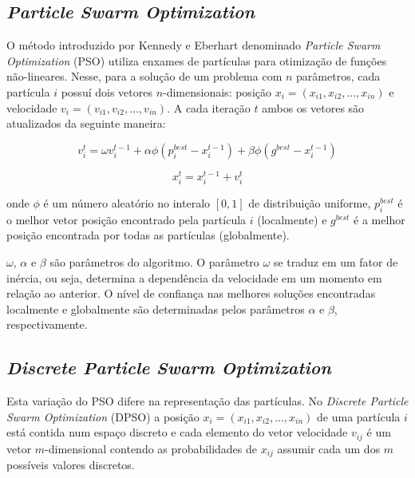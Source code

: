 \subsection{\textit{Particle Swarm Optimization}}

O método introduzido por Kennedy e Eberhart \cite{kennedy1995pso} denominado \textit{Particle Swarm Optimization} (PSO) utiliza enxames de partículas para otimização de funções não-lineares. Nesse, para a solução de um problema com $n$ parâmetros, cada partícula $i$ possuí dois vetores $n$-dimensionais: posição $x_{i} = (x_{i1}, x_{i2}, \dots, x_{in})$ e velocidade $v_{i} = (v_{i1}, v_{i2}, \dots, v_{in})$. A cada iteração $t$ ambos os vetores são atualizados da seguinte maneira:

\begin{equation}
\label{eq:pso-vel}
v_{i}^{t} = \omega v_{i}^{t-1} + \alpha \phi (p_{i}^{best} - x_{i}^{t-1}) + \beta \phi (g^{best} - x_{i}^{t-1})
\end{equation}

\begin{equation}
\label{eq:pso-pos}
x_{i}^{t} = x_{i}^{t-1} + v_{i}^{t}
\end{equation}

onde $\phi$ é um número aleatório no interalo $[0,1]$ de distribuição uniforme, $p_{i}^{best}$ é o melhor vetor posição encontrado pela partícula $i$ (localmente) e $g^{best}$ é a melhor posição encontrada por todas as partículas (globalmente).

$\omega$, $\alpha$ e $\beta$ são parâmetros do algoritmo. O parâmetro $\omega$ se traduz em um fator de inércia, ou seja, determina a dependência da velocidade em um momento em relação ao anterior. O nível de confiança nas melhores soluções encontradas localmente e globalmente são determinadas pelos parâmetros $\alpha$ e $\beta$, respectivamente.

\subsection{\textit{Discrete Particle Swarm Optimization}}

Esta variação do PSO difere na representação das partículas. No \textit{Discrete Particle Swarm Optimization} (DPSO) a posição $x_{i} = (x_{i1}, x_{i2}, \dots, x_{in})$ de uma partícula $i$ está contida num espaço discreto e cada elemento do vetor velocidade $v_{ij}$ é um vetor $m$-dimensional contendo as probabilidades de $x_{ij}$ assumir cada um dos $m$ possíveis valores discretos.

